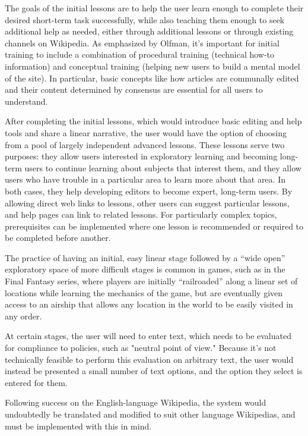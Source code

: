 \documentclass{acm_proc_article-sp}
\begin{document}
The goals of the initial lessons are to help the user learn enough to complete their desired short-term task successfully, while also teaching them enough to seek additional help as needed, either through additional lessons or through existing channels on Wikipedia. As emphasized by Olfman,\cite{Olfman:1994} it's important for initial training to include a combination of procedural training (technical how-to information) and conceptual training (helping new users to build a mental model of the site). In particular, basic concepts like how articles are communally edited and their content determined by consensus are essential for all users to understand.

After completing the initial lessons, which would introduce basic editing and help tools and share a linear narrative, the user would have the option of choosing from a pool of largely independent advanced lessons. These lessons serve two purposes: they allow users interested in exploratory learning and becoming long-term users to continue learning about subjects that interest them, and they allow users who have trouble in a particular area to learn more about that area. In both cases, they help developing editors to become expert, long-term users. By allowing direct web links to lessons, other users can suggest particular lessons, and help pages can link to related lessons. For particularly complex topics, prerequisites can be implemented where one lesson is recommended or required to be completed before another.

The practice of having an initial, easy linear stage followed by a ``wide open'' exploratory space of more difficult stages is common in games, such as in the Final Fantasy series, where players are initially ``railroaded'' along a linear set of locations while learning the mechanics of the game, but are eventually given access to an airship that allows any location in the world to be easily visited in any order.

At certain stages, the user will need to enter text, which needs to be evaluated for compliance to policies, such as "neutral point of view." Because it's not technically feasible to perform this evaluation on arbitrary text, the user would instead be presented a small number of text options, and the option they select is entered for them.

Following success on the English-language Wikipedia, the system would undoubtedly be translated and modified to suit other language Wikipedias, and must be implemented with this in mind.
\end{document}
